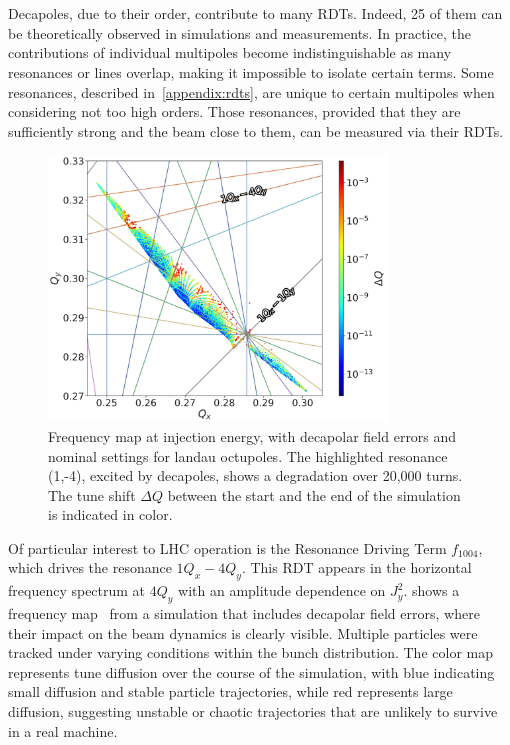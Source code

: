 \section{}

Decapoles, due to their order, contribute to many RDTs. Indeed, 25 of them can be theoretically 
observed in simulations and measurements. In practice, the contributions of individual multipoles
become indistinguishable as many resonances or lines overlap, making it impossible to isolate
certain terms. Some resonances, described in~\cref{appendix:rdts}, are unique to certain multipoles
when considering not too high orders. Those resonances, provided that they are sufficiently strong
and the beam close to them, can be measured via their RDTs.

\begin{figure}[!htb]
    \centering
    \includegraphics[width=0.8\textwidth]{./images/tune_diagram_f1004.pdf}
    \caption{Frequency map at injection energy, with decapolar field errors and nominal settings for
    landau octupoles. The highlighted resonance (1,-4), excited by decapoles, shows a degradation
    over 20,000 turns. The tune shift $\Delta Q$ between the start and the end of the simulation is
    indicated in color.}
    \label{fig:decapoles:rdts:tune_diagram}
\end{figure}

Of particular interest to LHC operation is the Resonance Driving Term $f_{1004}$, which drives
the resonance $1Q_x - 4Q_y$. This RDT appears in the horizontal frequency spectrum at $4Q_y$ with
an amplitude dependence on $J_y^2$. 
 shows a frequency
map~\cite{yannis_papaphilippou_detecting_2014} from a simulation that includes decapolar field
errors, where their impact on the beam dynamics is clearly visible. Multiple particles were tracked
under varying conditions within the bunch distribution. The color map represents tune diffusion over
the course of the simulation, with blue indicating small diffusion and stable particle trajectories,
while red represents large diffusion, suggesting unstable or chaotic trajectories that are unlikely
to survive in a real machine.

